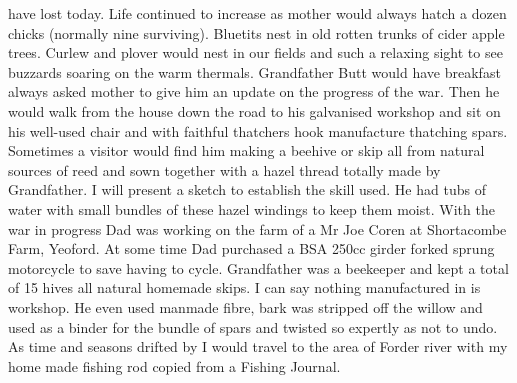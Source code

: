 have lost today. Life continued to increase as mother would always hatch a
dozen chicks (normally nine surviving). Bluetits nest in old rotten trunks of
cider apple trees. Curlew and plover would nest in our fields and such a
relaxing sight to see buzzards soaring on the warm thermals. Grandfather Butt
would have breakfast always asked mother to give him an update on the progress
of the war. Then he would walk from the house down the road to his galvanised
workshop and sit on his well-used chair and with faithful thatchers hook
manufacture thatching spars. Sometimes a visitor would find him making a
beehive or skip all from natural sources of reed and sown together with a hazel
thread totally made by Grandfather. I will present a sketch to establish the
skill used. He had tubs of water with small bundles of these hazel windings to
keep them moist. With the war in progress Dad was working on the farm of a Mr
Joe Coren at Shortacombe Farm, Yeoford. At some time Dad purchased a BSA 250cc
girder forked sprung motorcycle to save having to cycle. Grandfather was a
beekeeper and kept a total of 15 hives all natural homemade skips. I can say
nothing manufactured in is workshop. He even used manmade fibre, bark was
stripped off the willow and used as a binder for the bundle of spars and
twisted so expertly as not to undo. As time and seasons drifted by I would
travel to the area of Forder river with my home made fishing rod copied from a
Fishing Journal.
